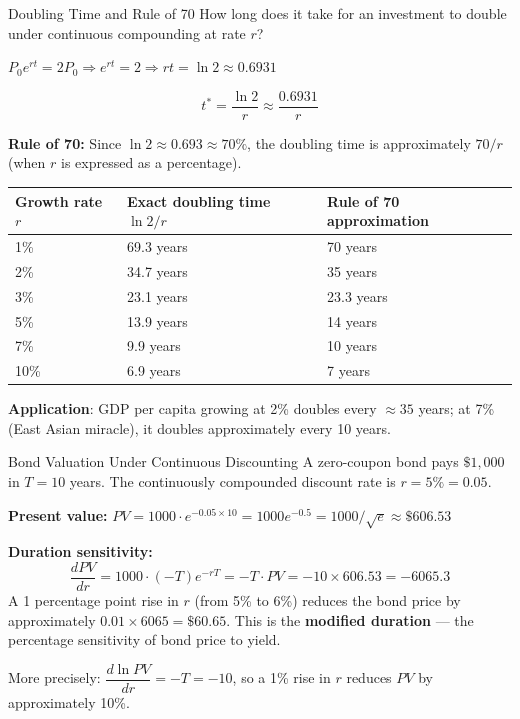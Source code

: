 \documentclass[12pt, a4paper]{article}
\theoremstyle{definition}
\newcommand{\ddd}[2]{\dfrac{d#1}{d#2}}
\begin{document}
\begin{exbox}{Doubling Time and Rule of 70}
How long does it take for an investment to double under continuous compounding at rate $r$?

$P_0 e^{rt} = 2P_0 \Rightarrow e^{rt} = 2 \Rightarrow rt = \ln 2 \approx 0.6931$

\[
  t^* = \frac{\ln 2}{r} \approx \frac{0.6931}{r}
\]

\textbf{Rule of 70:} Since $\ln 2 \approx 0.693 \approx 70\%$, the doubling time is approximately $70/r$ (when $r$ is expressed as a percentage).

\begin{center}
\begin{tabular}{lll}
  \toprule
  \rowcolor{tabhead}
  \color{white}Growth rate $r$ & \color{white}Exact doubling time $\ln 2/r$ & \color{white}Rule of 70 approximation \\
  \midrule
  1\% & 69.3 years & 70 years \\
  \rowcolor{tabeven}
  2\% & 34.7 years & 35 years \\
  3\% & 23.1 years & 23.3 years \\
  \rowcolor{tabeven}
  5\% & 13.9 years & 14 years \\
  7\% & 9.9 years & 10 years \\
  \rowcolor{tabeven}
  10\% & 6.9 years & 7 years \\
  \bottomrule
\end{tabular}
\end{center}

\textbf{Application}: GDP per capita growing at 2\% doubles every $\approx 35$ years; at 7\% (East Asian miracle), it doubles approximately every 10 years.
\end{exbox}

\begin{exbox}{Bond Valuation Under Continuous Discounting}
A zero-coupon bond pays $\$1{,}000$ in $T=10$ years. The continuously compounded discount rate is $r=5\%=0.05$.

\textbf{Present value:}
$PV = 1000 \cdot e^{-0.05\times 10} = 1000 e^{-0.5} = 1000 / \sqrt{e} \approx \$606.53$

\textbf{Duration sensitivity:}
\[
  \ddd{PV}{r} = 1000 \cdot (-T)e^{-rT} = -T \cdot PV = -10 \times 606.53 = -6065.3
\]
A 1 percentage point rise in $r$ (from 5\% to 6\%) reduces the bond price by approximately $0.01 \times 6065 = \$60.65$. This is the \textbf{modified duration} --- the percentage sensitivity of bond price to yield.

More precisely: $\dfrac{d\ln PV}{dr} = -T = -10$, so a 1\% rise in $r$ reduces $PV$ by approximately 10\%.
\end{exbox}
\end{document}
